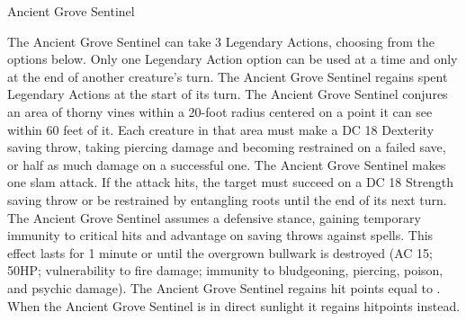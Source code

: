 \begin{DndMonster}[float*=b,width=\textwidth +8pt]{Ancient Grove Sentinel}
\begin{multicols}{2}
    The Ancient Grove Sentinel can take 3 Legendary Actions, choosing from the options below. Only one Legendary Action option can be used at a time and only at the end of another creature's turn. The Ancient Grove Sentinel regains spent Legendary Actions at the start of its turn.
    The Ancient Grove Sentinel conjures an area of thorny vines within a 20-foot radius centered on a point it can see within 60 feet of it. Each creature in that area must make a DC 18 Dexterity saving throw, taking  piercing damage and becoming restrained on a failed save, or half as much damage on a successful one.
    The Ancient Grove Sentinel makes one slam attack. If the attack hits, the target must succeed on a DC 18 Strength saving throw or be restrained by entangling roots until the end of its next turn.
	The Ancient Grove Sentinel assumes a defensive stance, gaining temporary immunity to critical hits and advantage on saving throws against spells. This effect lasts for 1 minute or until the overgrown bullwark is destroyed (AC 15; 50HP; vulnerability to fire damage; immunity to bludgeoning, piercing, poison, and psychic damage).
    The Ancient Grove Sentinel regains hit points equal to . When the Ancient Grove Sentinel is in direct sunlight it regains  hitpoints instead.
      
\end{multicols}\end{DndMonster}

\vfill\eject %

\vspace*{1.5cm}\begin{center}\end{center}%
%
